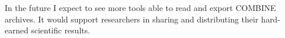 In the future I expect to see more tools able to read and export COMBINE archives.
It would support researchers in sharing and distributing their hard-earned scientific results.


% 
% 
% 
% 
% 
% 
% 
% 

